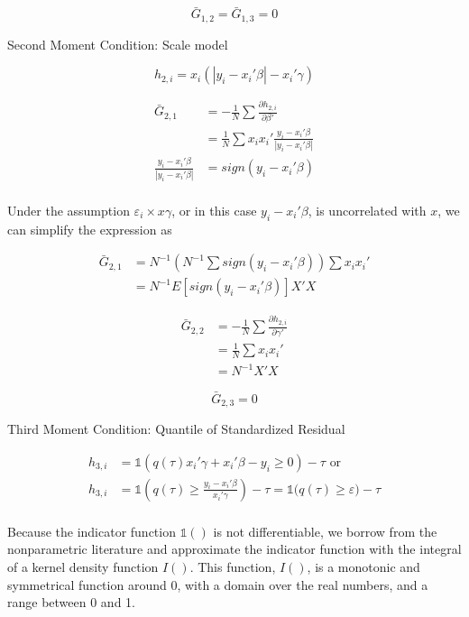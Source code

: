 \documentclass[
  authoryear,
  review,
  1p]{elsarticle}
\begin{document}
\[
\bar G_{1,2} = \bar G_{1,3} = 0
\]

Second Moment Condition: Scale model

\[h_{2,i}=x_i(|y_i-x_i'\beta|-x_i'\gamma)\]

\[\begin{aligned}
\bar G_{2,1} &= -\frac{1}{N} \sum \frac{\partial h_{2,i}}{\partial \beta'} \\
             &=  \frac{1}{N} \sum x_i x_i' \frac{y_i-x_i'\beta}{|y_i-x_i'\beta|} \\
\frac{y_i-x_i'\beta}{|y_i-x_i'\beta|} &= sign(y_i-x_i'\beta) \\            
\end{aligned}
\]

Under the assumption \(\varepsilon_i \times x\gamma\), or in this case
\(y_i-x_i'\beta\), is uncorrelated with \(x\), we can simplify the
expression as

\[\begin{aligned}
\bar G_{2,1} &= N^{-1} \left(N^{-1}\sum sign(y_i-x_i'\beta)\right) \sum x_i x_i' \\
&= N^{-1} E[sign(y_i-x_i'\beta)] X'X
\end{aligned}
\]

\[\begin{aligned}
\bar G_{2,2} &= -\frac{1}{N} \sum \frac{\partial h_{2,i}}{\partial \gamma'} \\
             &=  \frac{1}{N} \sum x_i x_i' \\
             &= N^{-1} X'X
\end{aligned}
\]

\[\bar G_{2,3}=0\]

Third Moment Condition: Quantile of Standardized Residual

\[\begin{aligned}
h_{3,i} &= \mathbb{1}\left(q(\tau) x_i'\gamma +x_i'\beta - y_i \geq 0 \right) - \tau \text{ or}\\
h_{3,i} &= \mathbb{1}\left( q(\tau)  \geq \frac{y_i- x_i'\beta}{x_i'\gamma}  \right) - \tau = \mathbb{1}\big( q(\tau)  \geq \varepsilon  \big) - \tau \\
\end{aligned}
\]

Because the indicator function \(\mathbb{1}()\) is not differentiable,
we borrow from the nonparametric literature and approximate the
indicator function with the integral of a kernel density function
\(I()\). This function, \(I()\), is a monotonic and symmetrical function
around 0, with a domain over the real numbers, and a range between 0 and
1.
\end{document}
